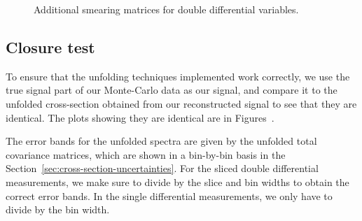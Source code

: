 \documentclass{article}
\begin{document}
\begin{figure}
    \caption{Additional smearing matrices for double differential variables.}
    \label{fig:smear-double-diff}
\end{figure}

\clearpage

\subsection{Closure test}

To ensure that the unfolding techniques implemented work correctly, we use the true signal part of our Monte-Carlo data  
as our signal, and compare it to the unfolded cross-section obtained from our reconstructed signal to see that they are identical.
The plots showing they are identical are in Figures~.

The error bands for the unfolded spectra are given by the unfolded total covariance matrices, which are shown in a
bin-by-bin basis in the Section~\ref{sec:cross-section-uncertainties}. For the sliced double 
differential measurements, we make sure to divide by the slice and bin widths to obtain the correct error bands.
In the single differential measurements, we only have to divide by the bin width. 
\end{document}
